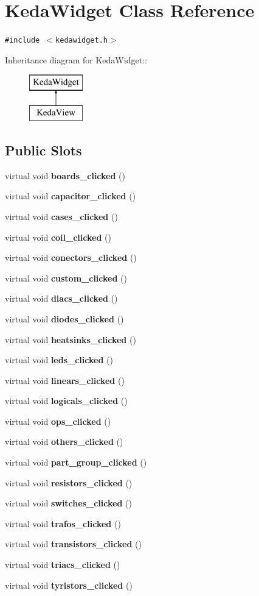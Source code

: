 \section{Keda\-Widget Class Reference}
\label{classKedaWidget}
{\tt \#include $<$kedawidget.h$>$}

Inheritance diagram for Keda\-Widget::\begin{figure}[H]
\begin{center}
\leavevmode
\includegraphics[height=2cm]{classKedaWidget}
\end{center}
\end{figure}
\subsection*{Public Slots}
\begin{CompactItemize}
\item 
virtual void {\bf boards\_\-clicked} ()
\item 
virtual void {\bf capacitor\_\-clicked} ()
\item 
virtual void {\bf cases\_\-clicked} ()
\item 
virtual void {\bf coil\_\-clicked} ()
\item 
virtual void {\bf conectors\_\-clicked} ()
\item 
virtual void {\bf custom\_\-clicked} ()
\item 
virtual void {\bf diacs\_\-clicked} ()
\item 
virtual void {\bf diodes\_\-clicked} ()
\item 
virtual void {\bf heatsinks\_\-clicked} ()
\item 
virtual void {\bf leds\_\-clicked} ()
\item 
virtual void {\bf linears\_\-clicked} ()
\item 
virtual void {\bf logicals\_\-clicked} ()
\item 
virtual void {\bf ops\_\-clicked} ()
\item 
virtual void {\bf others\_\-clicked} ()
\item 
virtual void {\bf part\_\-group\_\-clicked} ()
\item 
virtual void {\bf resistors\_\-clicked} ()
\item 
virtual void {\bf switches\_\-clicked} ()
\item 
virtual void {\bf trafos\_\-clicked} ()
\item 
virtual void {\bf transistors\_\-clicked} ()
\item 
virtual void {\bf triacs\_\-clicked} ()
\item 
virtual void {\bf tyristors\_\-clicked} ()
\end{CompactItemize}
